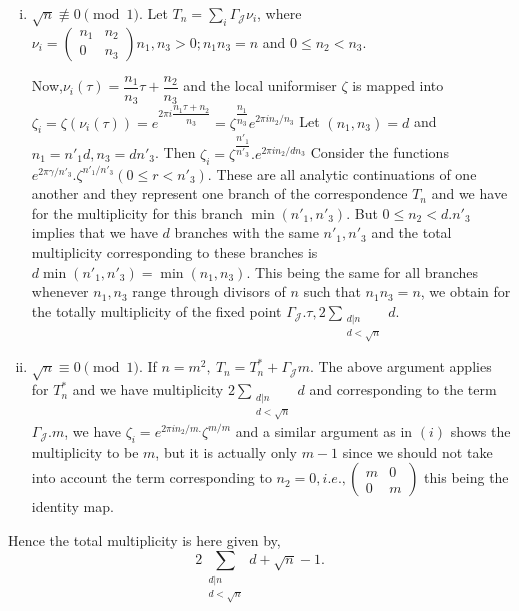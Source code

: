 \begin{enumerate}[i)]
 \item $\sqrt{n} \not \equiv 0 \pmod 1$. Let $T_n = \sum \limits_{i}
   \Gamma_\mathcal{J} \nu _i$, where $\nu_i = \begin{pmatrix} n_1 &
     n_2 \\ 0 & n_3 \end{pmatrix} n_1, n_3 > 0; n_1 n_3 = n$ and $0
   \leq n_2 < n_3$. 
   
   Now,\pageoriginale $\nu_i (\tau ) = \dfrac{n_1}{n_3} \tau + \dfrac{n_2}{n_3}$ and
   the local uniformiser $\zeta$ is mapped into $\zeta_i = \zeta
   (\nu_i (\tau))= e^{2 \pi i \dfrac{n_1 \tau + n_2}{n_3}} =
   \zeta^{\dfrac{n_1}{n_3}} e^{2 \pi i n_2/n_3}$ Let $(n_1, n_3) = d$
   and $n_1 = n'_1 d, n_3 = dn'_3$. Then $\zeta_i =
   \zeta^{\dfrac{n'_1}{n'_3}}. e^{2 \pi i n_2/dn_3}$ Consider the
   functions $e^{2 \pi \gamma/n'_3}. \zeta^{n'_1/n'_3}(0 \leq r <
   n'_3)$. These are all analytic continuations of one another and
   they represent one branch of the correspondence $T_n$ and we have
   for the multiplicity for this branch $\min (n'_1,n'_3)$. But $0 \leq
   n_2 < d.n'_3$ implies that we have $d$ branches with the same
   $n'_1, n'_3$ and the total multiplicity corresponding to these
   branches is $d \min (n'_1, n'_3)= \min (n_1, n_3)$. This being the
   same for all branches whenever $n_1, n_3$ range through divisors of
   $n$ such that $n_1 n_3 = n$, we obtain for the totally multiplicity
   of the fixed point $\Gamma_\mathcal{J}. \tau, 2 \sum
   \limits_{\substack{ d|n \\ {d < \sqrt{n} }}} d$. 
 \item $\sqrt{n} \equiv 0 \pmod 1$. If $n = m^2,~T_n = T^*_n + \Gamma
   _\mathcal{J}m$. The above argument applies for $T^*_n$ and we have
   multiplicity $2 \sum \limits_ {\substack {d | n \\ {d < \sqrt{n}}}}
   d$ and corresponding to the term $\Gamma_\mathcal{J}. m$, we have
   $\zeta_i = e^{2 \pi i n_2/m.} \zeta^{m/m}$ and a similar argument
   as in $(i)$ shows the multiplicity to be $m$, but it is actually
   only $m-1$ since we should not take into account the term
   corresponding to $n_2 = 0, i.e., \begin{pmatrix} m & 0 \\ 0 &
     m \end{pmatrix}$ this being the identity map. 
\end{enumerate}

Hence the total multiplicity is here given by, 
$$
2 \sum_{\substack { d|n \\ {d < \sqrt{n}}}} d+ \sqrt{n}-1.
$$

